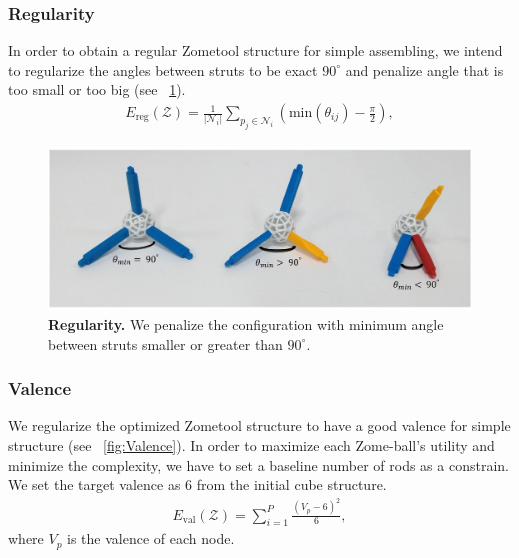 
\subsubsection{Regularity}
In order to obtain a regular Zometool structure for simple assembling, we intend to regularize the angles between struts to be exact $90^\circ$ and penalize angle that is too small or too big (see \figname~\ref{fig:Regularity}).
\begin{align}
E_{\text{reg}}(\mathcal{Z}) = \frac{1}{|\mathcal{N}_i|} \sum_{p_j\in\mathcal{N}_i} (\text{min}(\theta_{ij})-\frac{\pi}{2}),
\end{align}

\begin{figure}[ht]
\centering
\includegraphics[width=1.0\linewidth]{figs/Regularity.pdf} 
\caption{\textbf{Regularity.} We penalize the configuration with minimum angle between struts smaller or greater than $90^\circ$.}
\label{fig:Regularity}
\end{figure}

\subsubsection{Valence}
We regularize the optimized Zometool structure to have a good valence for simple structure (see \figname~\ref{fig:Valence}). 
In order to maximize each Zome-ball's utility and minimize the complexity, we have to set a baseline number of rods as a constrain.
We set the target valence as $6$ from the initial cube structure.
\begin{align}
E_{\text{val}}(\mathcal{Z}) = \sum_{i=1}^{P} \frac{(V_p-6)^2}{6},
\end{align}
where $V_p$ is the valence of each node.

